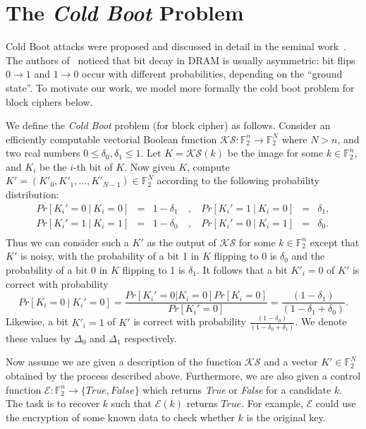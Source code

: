 \documentclass{llncs}
\newcommand{\coldboot}{\emph{Cold Boot}\xspace}
\newcommand{\field}[1]{\mathbb{#1}}
\newcommand{\F}{\field{F}}
\begin{document}
\section{The \coldboot Problem}
\label{sec:coldboot}

Cold Boot attacks were proposed and discussed in detail in the seminal work~\cite{coldboot}. The authors of~\cite{coldboot} noticed that bit decay in DRAM is usually asymmetric: bit flips $0 \rightarrow 1$ and
$1 \rightarrow 0$ occur with different probabilities, depending on the ``ground state''. To motivate our work, we model more formally the cold boot problem for block ciphers below.

We define the \coldboot problem (for block cipher) as follows. Consider an efficiently computable vectorial Boolean function $\mathcal{KS}: \F_2^n \rightarrow \F_2^N$ where $N > n$, and two real numbers $0\leq \delta_0, \delta_1 \leq 1$. Let $K = \mathcal{KS}(k)$ be the image for some $k \in \F_2^n$, and $K_i$ be the $i$-th bit of $K$. Now given $K$, compute $K' = (K'_0, K'_1, \ldots, K'_{N-1}) \in \F_2^N$ according to the following probability distribution: 
$$
\begin{array}{lllllll}
Pr[K_i' = 0 \ | \ K_i = 0]  &=& 1 - \delta_1 & \ , \ & Pr[K_i' = 1 \ | \ K_i = 0]  &=& \delta_1,\\
Pr[K_i' = 1 \ | \ K_i = 1]  &=& 1 - \delta_0 & \ , \ & Pr[K_i' = 0 \ | \ K_i = 1]  &=& \delta_0.\\
\end{array}
$$
Thus we can consider such a $K'$ as the output of $\mathcal{KS}$ for some $k \in \F_2^n$ except that $K'$ is noisy, with the probability of a bit 1 in $K$ flipping to 0 is $\delta_0$ and
the probability of a bit 0 in $K$ flipping to 1 is $\delta_1$.
It follows that a bit $K'_i = 0$ of $K'$ is correct with probability
$$
Pr[K_i = 0 \ | \ K_i' = 0] = \frac{Pr[K_i'=0 | K_i=0]Pr[K_i=0]}{Pr[K_i'=0]} = \frac{(1 - \delta_1)}{(1 - \delta_1 + \delta_0)}.
$$
Likewise, a bit $K'_i = 1$ of $K'$ is correct with probability $\frac{(1 - \delta_0)}{(1 - \delta_0 + \delta_1)}$. We denote these values by $\Delta_0$ and $\Delta_1$ respectively.

Now assume we are given a description of the function $\mathcal{KS}$ and a vector $K' \in \F_2^N$ obtained by the process described above.
Furthermore, we are also given a control function $\mathcal{E}: \F_2^n \rightarrow \{True,False\}$ which returns \emph{True} or \emph{False} for a candidate $k$.  The task is to recover $k$ such that $\mathcal{E}(k)$ returns $True$. For example, $\mathcal{E}$ could use the encryption of some known data to check whether $k$ is the original key.
\end{document}
